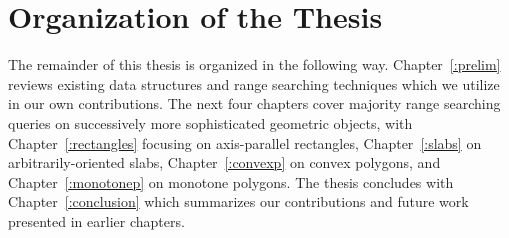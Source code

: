 \section{Organization of the Thesis}
\label{:intro:organization}

The remainder of this thesis is organized in the following way. 
Chapter~\ref{:prelim} reviews existing data structures and range searching techniques which we utilize in our own contributions.
The next four chapters cover majority range searching queries on successively more sophisticated geometric objects, with Chapter~\ref{:rectangles} focusing on axis-parallel rectangles, Chapter~\ref{:slabs} on arbitrarily-oriented slabs, Chapter~\ref{:convexp} on convex polygons, and Chapter~\ref{:monotonep} on monotone polygons.
The thesis concludes with Chapter~\ref{:conclusion} which summarizes our contributions and future work presented in earlier chapters.
